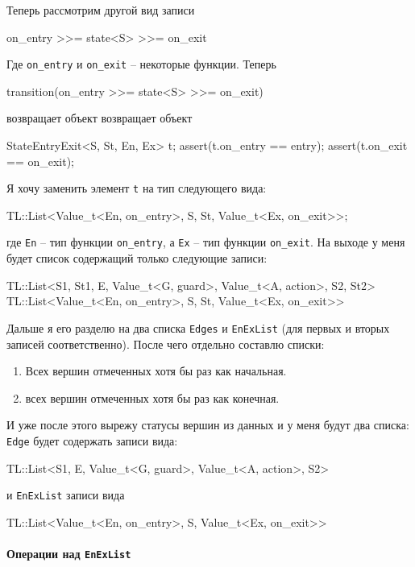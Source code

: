 \documentclass{article}
\begin{document}
{Теперь рассмотрим другой вид записи
\begin{cppcode}[\nonumbers]
on_entry >>= state<S> >>= on_exit
\end{cppcode}
Где \verb"on_entry" и \verb"on_exit" -- некоторые функции.
Теперь
\begin{cppcode}[\nonumbers]
transition(on_entry >>= state<S> >>= on_exit)
\end{cppcode}
возвращает объект
возвращает объект
\begin{cppcode}[\nonumbers]
StateEntryExit<S, St, En, Ex> t;
assert(t.on_entry == entry);
assert(t.on_exit == on_exit);
\end{cppcode}
Я хочу заменить элемент \verb"t" на тип следующего вида:
\begin{cppcode}[\nonumbers]
TL::List<Value_t<En, on_entry>, S, St, Value_t<Ex, on_exit>>;
\end{cppcode}
где \verb"En" -- тип функции \verb"on_entry", а \verb"Ex" -- тип функции \verb"on_exit".
На выходе у меня будет список содержащий только следующие записи:
\begin{cppcode}[\nonumbers]
TL::List<S1, St1, E, Value_t<G, guard>, Value_t<A, action>, S2, St2>
TL::List<Value_t<En, on_entry>, S, St, Value_t<Ex, on_exit>>
\end{cppcode}
Дальше я его разделю на два списка \verb"Edges" и \verb"EnExList" (для первых и вторых записей соответственно).
После чего отдельно составлю списки:
\begin{enumerate}
\item Всех вершин отмеченных хотя бы раз как начальная.

\item всех вершин отмеченных хотя бы раз как конечная.
\end{enumerate}
И уже после этого вырежу статусы вершин из данных и у меня будут два списка: \verb"Edge" будет содержать записи вида:
\begin{cppcode}[\nonumbers]
TL::List<S1, E, Value_t<G, guard>, Value_t<A, action>, S2>
\end{cppcode}
и \verb"EnExList" записи вида
\begin{cppcode}[\nonumbers]
TL::List<Value_t<En, on_entry>, S, Value_t<Ex, on_exit>>
\end{cppcode}

\paragraph{Операции над \texttt{EnExList}}

}
\end{document}
